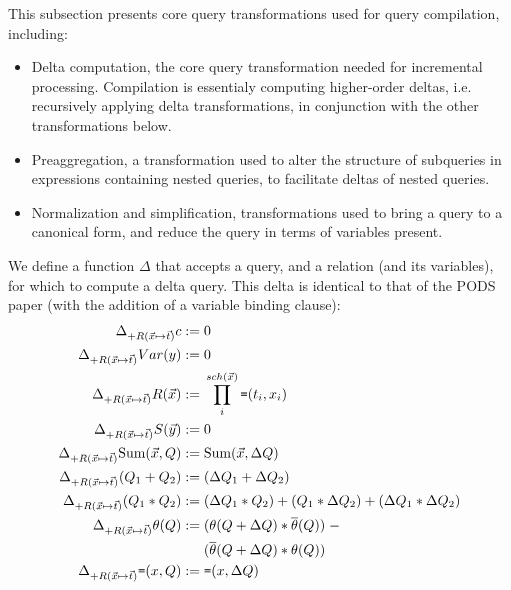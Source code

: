 \noindent This subsection presents core query transformations used for query
compilation, including:
\begin{itemize}
  \item Delta computation, the core query transformation needed for incremental
  processing. Compilation is essentialy computing higher-order deltas, i.e.
  recursively applying delta transformations, in conjunction with the other
  transformations below.
  \item Preaggregation, a transformation used to alter the structure of
  subqueries in expressions containing nested queries, to facilitate deltas of
  nested queries.
  \item Normalization and simplification, transformations used to bring a query
  to a canonical form, and reduce the query in terms of variables present.
\end{itemize}

We define a function $\Delta$ that accepts a query, and a relation (and its
variables), for which to compute a delta query. This delta is identical to that
of the PODS paper (with the addition of a variable binding clause):
\begin{align*}
\Delta_{+R(\vec{x} \mapsto \vec{t})} c := & \; 0
\\
\Delta_{+R(\vec{x} \mapsto \vec{t})} Var(y) := & \; 0
\\
\Delta_{+R(\vec{x} \mapsto \vec{t})} R(\vec{x}) := & \;
\prod_i^{sch(\vec{x})} \mbox{{\tt =}}(t_i,x_i)
\\
\Delta_{+R(\vec{x} \mapsto \vec{t})} S(\vec{y}) := & \; 0
\\
\Delta_{+R(\vec{x} \mapsto \vec{t})}
\mbox{Sum}(\vec{x},Q) := & \; \mbox{Sum}(\vec{x},\Delta Q)
\\
\Delta_{+R(\vec{x} \mapsto \vec{t})} (Q_1 + Q_2) := & \;
(\Delta Q_1 + \Delta Q_2)
\\
\Delta_{+R(\vec{x} \mapsto \vec{t})} (Q_1 * Q_2) := & \;
(\Delta Q_1 * Q_2) +
(Q_1 * \Delta Q_2) +
(\Delta Q_1 * \Delta Q_2)
\\
\Delta_{+R(\vec{x} \mapsto \vec{t})} \theta(Q) := & \;
(\theta(Q + \Delta Q) * \overline{\theta}(Q)) \; -
\\
& \; (\overline{\theta}(Q+\Delta Q) * \theta(Q))
\\
\Delta_{+R(\vec{x} \mapsto \vec{t})} \mbox{{\tt =}}(x,Q) := & \;
    \mbox{{\tt =}}(x,\Delta Q)
\end{align*}

